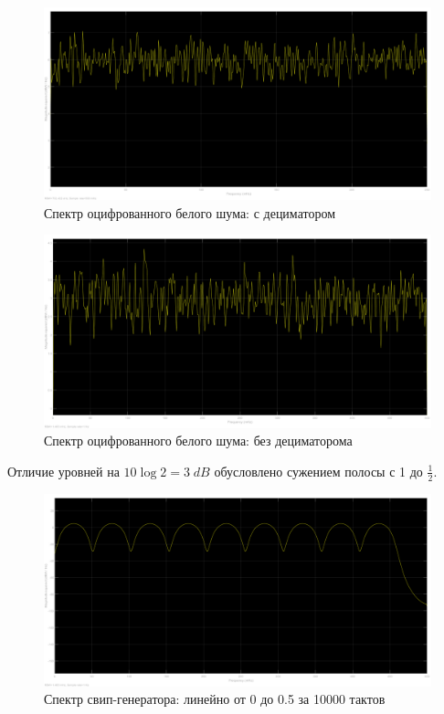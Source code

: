 \documentclass[12pt,a4paper]{article}
\begin{document}
	\begin{figure}[H]
		\centering
		\includegraphics[width=1.0\linewidth]{res/1_noise_wdec.png}
		\caption{Спектр оцифрованного белого шума: с дециматором}
	\end{figure}
	
	\begin{figure}[H]
		\centering
		\includegraphics[width=1.0\linewidth]{res/1_noise_wodec.png}
		\caption{Спектр оцифрованного белого шума: без дециматорома}
	\end{figure}
	
	Отличие уровней на $10 \log 2 = 3 \; dB$ обусловлено сужением полосы с 1 до $\frac{1}{2}$.

	\begin{figure}[H]
		\centering
		\includegraphics[width=1.0\linewidth]{res/1_chirp.png}
		\caption{Спектр свип-генератора: линейно от 0 до 0.5 за 10000 тактов}
	\end{figure}
	
\end{document}
